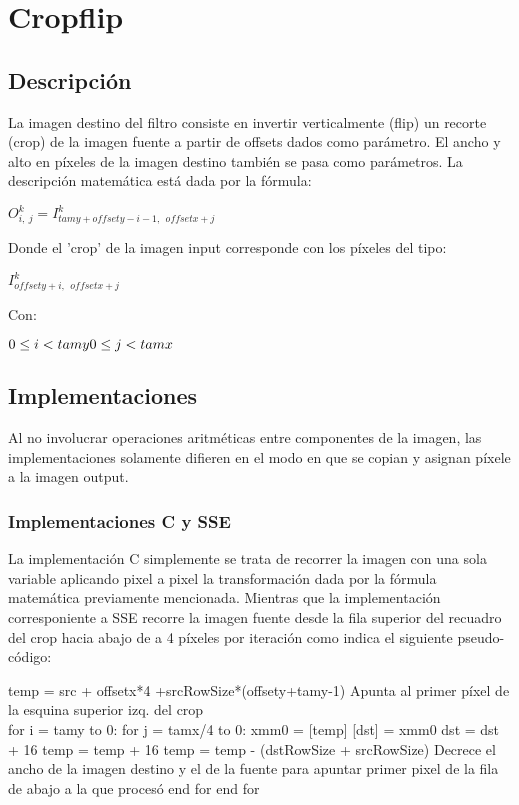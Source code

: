\section{Cropflip}

\subsection{Descripción}
La imagen destino del filtro consiste en invertir verticalmente (flip) un recorte (crop) de la imagen fuente a partir de offsets dados como parámetro. El ancho y alto en píxeles de la imagen destino también se pasa como parámetros.
La descripción matemática está dada por la fórmula:

$O_{i,\ j}^{k}=I_{tamy+offsety-i-1, \ \ offsetx+j}^{k}$

Donde el 'crop' de la imagen input corresponde con los píxeles del tipo:

$I_{offsety+i, \ \ offsetx+j}^{k}$

Con: 

 $ 0 \leq i < tamy \\ 0 \leq j < tamx$


\subsection{Implementaciones}
Al no involucrar operaciones aritméticas entre componentes de la imagen, las implementaciones solamente difieren en el modo en que se copian y asignan píxele a la imagen output.
\subsubsection{Implementaciones C y SSE}
La implementación C simplemente se trata de recorrer la imagen con una sola variable aplicando pixel a pixel la transformación dada por la fórmula matemática previamente mencionada. Mientras que la implementación corresponiente a SSE recorre la imagen fuente desde la fila superior del recuadro del crop hacia abajo de a 4 píxeles por iteración como indica el siguiente pseudo-código: 

temp = src + offsetx*4 +srcRowSize*(offsety+tamy-1)       {Apunta al primer píxel de la esquina superior izq. del crop}\\ 
for i = tamy to 0: 
  for j = tamx/4 to 0: 
    xmm0 = [temp]
    [dst] = xmm0
    dst = dst  + 16
    temp =  temp + 16
  temp = temp - (dstRowSize + srcRowSize)       {Decrece el ancho de la imagen destino y el de la fuente para apuntar primer pixel de la fila de abajo a la que procesó}      
  end for
end for

